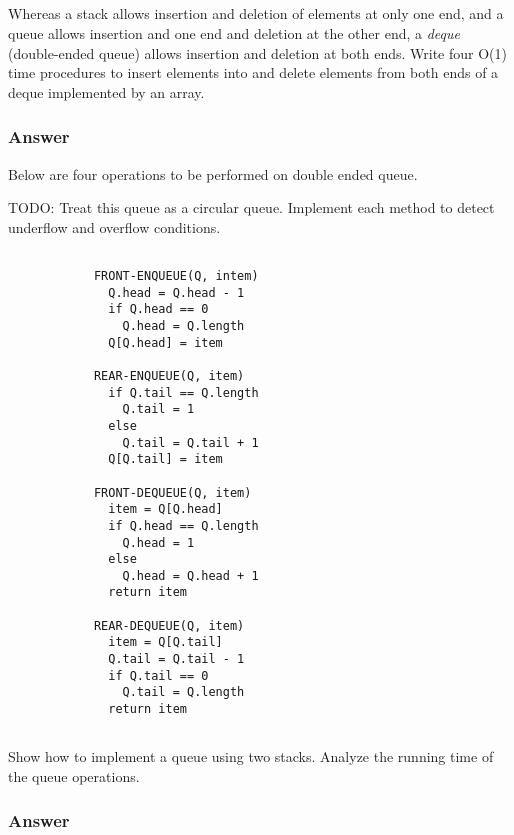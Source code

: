       \subsection{}

      Whereas a stack allows insertion and deletion of elements at only one
      end, and a queue allows insertion and one end and deletion at the other
      end, a \textit{deque} (double-ended queue) allows insertion and deletion
      at both ends. Write four O(1) time procedures to insert elements into and
      delete elements from both ends of a deque implemented by an array.

        \subsubsection{Answer}
          Below are four operations to be performed on double ended queue.

          TODO: Treat this queue as a circular queue. Implement each method to
          detect underflow and overflow conditions.

          \begin{verbatim}

            FRONT-ENQUEUE(Q, intem)
              Q.head = Q.head - 1
              if Q.head == 0
                Q.head = Q.length
              Q[Q.head] = item

            REAR-ENQUEUE(Q, item)
              if Q.tail == Q.length
                Q.tail = 1
              else
                Q.tail = Q.tail + 1
              Q[Q.tail] = item

            FRONT-DEQUEUE(Q, item)
              item = Q[Q.head]
              if Q.head == Q.length
                Q.head = 1
              else
                Q.head = Q.head + 1
              return item

            REAR-DEQUEUE(Q, item)
              item = Q[Q.tail]
              Q.tail = Q.tail - 1
              if Q.tail == 0
                Q.tail = Q.length
              return item
          \end{verbatim}

      \subsection{}

        Show how to implement a queue using two stacks. Analyze the running
        time of the queue operations.

        \subsubsection{Answer}

